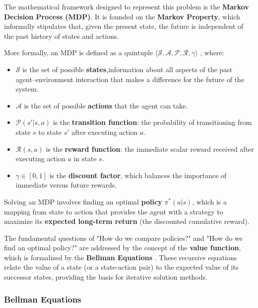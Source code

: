\documentclass[conference]{IEEEtran}
\begin{document}
The mathematical framework designed to represent this problem is the \textbf{Markov Decision Process (MDP)}. It is founded on the \textbf{Markov Property}, which informally stipulates that, given the present state, the future is independent of the past history of states and actions.

More formally, an MDP is defined as a quintuple $\langle \mathcal{S}, \mathcal{A}, \mathcal{P}, \mathcal{R}, \gamma \rangle$ \cite{suttonReinforcementLearningIntroduction2014}, where:

\begin{itemize}
    \item $\mathcal{S}$ is the set of possible \textbf{states},information about all aspects
of the past agent–environment interaction that makes a difference for the future of the system.
    \item $\mathcal{A}$ is the set of possible \textbf{actions} that the agent can take.
    \item $\mathcal{P}(s'|s, a)$ is the \textbf{transition function}: the probability of transitioning from state $s$ to state $s'$ after executing action $a$.
    \item $\mathcal{R}(s, a)$ is the \textbf{reward function}: the immediate scalar reward received after executing action $a$ in state $s$.
    \item $\gamma \in [0, 1]$ is the \textbf{discount factor}, which balances the importance of immediate versus future rewards.
\end{itemize}

Solving an MDP involves finding an optimal \textbf{policy} $\pi^{*}(a|s)$, which is a mapping from state to action that provides the agent with a strategy to maximize its \textbf{expected long-term return} (the discounted cumulative reward).

The fundamental questions of "How do we compare policies?" and "How do we find an optimal policy?" are addressed by the concept of the \textbf{value function}, which is formalized by the \textbf{Bellman Equations} \cite{suttonReinforcementLearningIntroduction2014}. These recursive equations relate the value of a state (or a state-action pair) to the expected value of its successor states, providing the basis for iterative solution methods.

\subsubsection{Bellman Equations}
\end{document}
